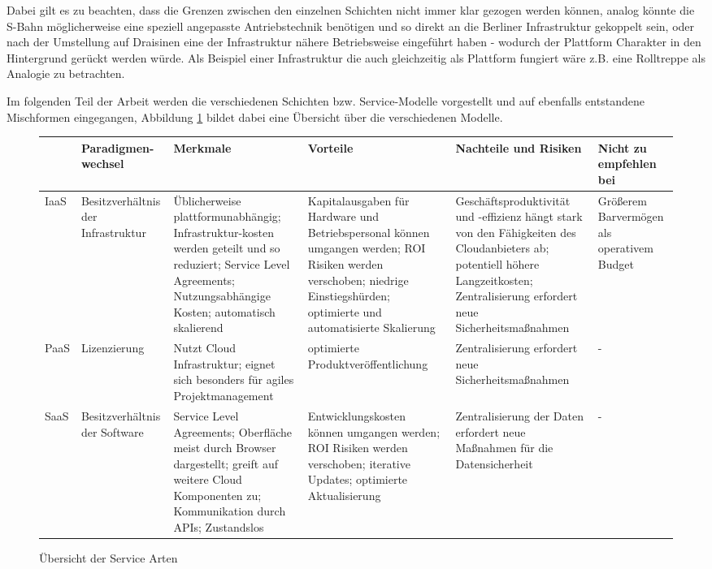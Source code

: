 Dabei gilt es zu beachten, dass die Grenzen zwischen den einzelnen Schichten nicht immer klar gezogen werden können, analog könnte die S-Bahn möglicherweise eine speziell angepasste Antriebstechnik benötigen und so direkt an die Berliner Infrastruktur gekoppelt sein, oder nach der Umstellung auf Draisinen eine der Infrastruktur nähere Betriebsweise eingeführt haben - wodurch der Plattform Charakter in den Hintergrund gerückt werden würde. Als Beispiel einer Infrastruktur die auch gleichzeitig als Plattform fungiert wäre z.B. eine Rolltreppe als Analogie zu betrachten.

Im folgenden Teil der Arbeit werden die verschiedenen Schichten bzw. Service-Modelle vorgestellt und auf ebenfalls entstandene Mischformen eingegangen, Abbildung \ref{serviceModelsTable} bildet dabei eine Übersicht über die verschiedenen Modelle.

\begin{figure}
	\centering
	\begin{tabular}{|l|>{\RaggedRight}p{2cm}|>{\RaggedRight}p{3cm}|>{\RaggedRight}p{3cm}|>{\RaggedRight}p{3cm}|>{\RaggedRight}p{3cm}|}
		\hline
		\rule[-2ex]{0pt}{5.5ex} & \textbf{Paradigmen- wechsel} & \textbf{Merkmale} & \textbf{Vorteile} & \textbf{Nachteile \newline und Risiken} & \textbf{Nicht zu empfehlen bei} \\ 
		\hline
		\rule[-2ex]{0pt}{5.5ex} IaaS & Besitzverhältnis der Infrastruktur & Üblicherweise plattformunabhängig; Infrastruktur-kosten werden geteilt und so reduziert; Service Level Agreements; Nutzungsabhängige Kosten; automatisch skalierend & Kapitalausgaben für Hardware und Betriebspersonal können umgangen werden; ROI Risiken werden verschoben; niedrige Einstiegshürden; optimierte und automatisierte Skalierung & Geschäftsproduktivität und -effizienz hängt stark von den Fähigkeiten des Cloudanbieters ab; potentiell höhere Langzeitkosten; Zentralisierung erfordert neue Sicherheitsmaßnahmen & Größerem Barvermögen als operativem Budget \\ 
		\hline
		\rule[-2ex]{0pt}{5.5ex} PaaS & Lizenzierung & Nutzt Cloud Infrastruktur; eignet sich besonders für agiles Projektmanagement & optimierte Produktveröffentlichung & Zentralisierung erfordert neue Sicherheitsmaßnahmen & - \\ 
		\hline
		\rule[-2ex]{0pt}{5.5ex} SaaS & Besitzverhältnis der Software & Service Level Agreements; Oberfläche meist durch Browser dargestellt; greift auf weitere Cloud Komponenten zu; Kommunikation durch APIs; Zustandslos & Entwicklungskosten können umgangen werden; ROI Risiken werden verschoben; iterative Updates; optimierte Aktualisierung & Zentralisierung der Daten erfordert neue Maßnahmen für die Datensicherheit & - \\ 
		\hline
	\end{tabular}
	\label{serviceModelsTable}
	\caption{Übersicht der Service Arten}
\end{figure}
 
